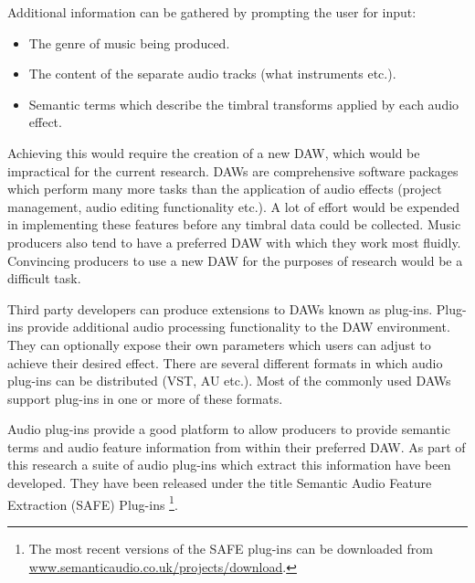 		Additional information can be gathered by prompting the user for input:

		\begin{itemize}
			\item The genre of music being produced.
			\item The content of the separate audio tracks (what instruments etc.).
			\item Semantic terms which describe the timbral transforms applied by each audio
			      effect.
		\end{itemize}

		Achieving this would require the creation of a new DAW, which would be impractical for the current
		research. DAWs are comprehensive software packages which perform many more tasks than the application of
		audio effects (project management, audio editing functionality etc.). A lot of effort would be expended in
		implementing these features before any timbral data could be collected. Music producers also tend to have a
		preferred DAW with which they work most fluidly. Convincing producers to use a new DAW for the purposes of
		research would be a difficult task.

		Third party developers can produce extensions to DAWs known as plug-ins. Plug-ins provide additional audio
		processing functionality to the DAW environment. They can optionally expose their own parameters which
		users can adjust to achieve their desired effect. There are several different formats in which audio
		plug-ins can be distributed (VST, AU etc.). Most of the commonly used DAWs support plug-ins in one or more
		of these formats.

		Audio plug-ins provide a good platform to allow producers to provide semantic terms and audio feature
		information from within their preferred DAW. As part of this research a suite of audio plug-ins which
		extract this information have been developed. They have been released under the title Semantic Audio
		Feature Extraction (SAFE) Plug-ins \footnote{The most recent versions of the SAFE plug-ins can be
		downloaded from \href{http://www.semanticaudio.co.uk/projects/download/}
		{www.semanticaudio.co.uk/projects/download}.}.

